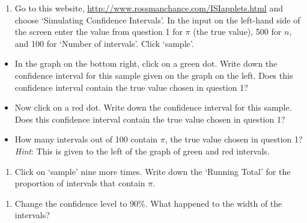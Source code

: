 \documentclass[
]{report}
\providecommand{\tightlist}{%
  \setlength{\itemsep}{0pt}\setlength{\parskip}{0pt}}
\begin{document}
\vspace{0.2in}

\begin{enumerate}
\def\labelenumi{\arabic{enumi}.}
\setcounter{enumi}{1}
\tightlist
\item
  Go to this website, \url{http://www.rossmanchance.com/ISIapplets.html} and choose `Simulating Confidence Intervals'. In the input on the left-hand side of the screen enter the value from question 1 for \(\pi\) (the true value), 500 for \(n\), and 100 for `Number of intervals'. Click `sample'.
\end{enumerate}

\vspace{1mm}

\begin{itemize}
\tightlist
\item
  In the graph on the bottom right, click on a green dot. Write down the confidence interval for this sample given on the graph on the left. Does this confidence interval contain the true value chosen in question 1?
\end{itemize}

\vspace{0.4in}

\begin{itemize}
\item
  Now click on a red dot. Write down the confidence interval for this sample. Does this confidence interval contain the true value chosen in question 1?
  \vspace{0.5in}
\item
  How many intervals out of 100 contain \(\pi\), the true value chosen in question 1? \emph{Hint}: This is given to the left of the graph of green and red intervals.
  \vspace{0.4in}
\end{itemize}

\begin{enumerate}
\def\labelenumi{\arabic{enumi}.}
\setcounter{enumi}{2}
\tightlist
\item
  Click on `sample' nine more times. Write down the `Running Total' for the proportion of intervals that contain \(\pi\).
\end{enumerate}

\vspace{0.5in}

\begin{enumerate}
\def\labelenumi{\arabic{enumi}.}
\setcounter{enumi}{3}
\tightlist
\item
  Change the confidence level to 90\%. What happened to the width of the intervals?
\end{enumerate}
\end{document}
